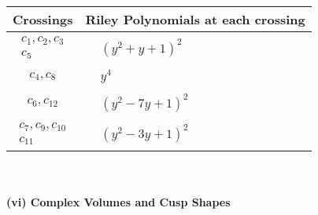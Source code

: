 \documentclass[1p]{elsarticle_modified}
\theoremstyle{definition}
\begin{document}
\begin{tabular}{m{50pt}|m{274pt}}
Crossings & \hspace{64pt}Riley Polynomials at each crossing \\
\hline $$\begin{aligned}c_{1},c_{2},c_{3}\\c_{5}\end{aligned}$$&$\begin{aligned}
&(y^2+y+1)^2
\end{aligned}$\\
\hline $$\begin{aligned}c_{4},c_{8}\end{aligned}$$&$\begin{aligned}
&y^4
\end{aligned}$\\
\hline $$\begin{aligned}c_{6},c_{12}\end{aligned}$$&$\begin{aligned}
&(y^2-7 y+1)^2
\end{aligned}$\\
\hline $$\begin{aligned}c_{7},c_{9},c_{10}\\c_{11}\end{aligned}$$&$\begin{aligned}
&(y^2-3 y+1)^2
\end{aligned}$\\
\hline
\end{tabular}\\~\\
\newpage\flushleft \textbf{(vi) Complex Volumes and Cusp Shapes}
\end{document}
